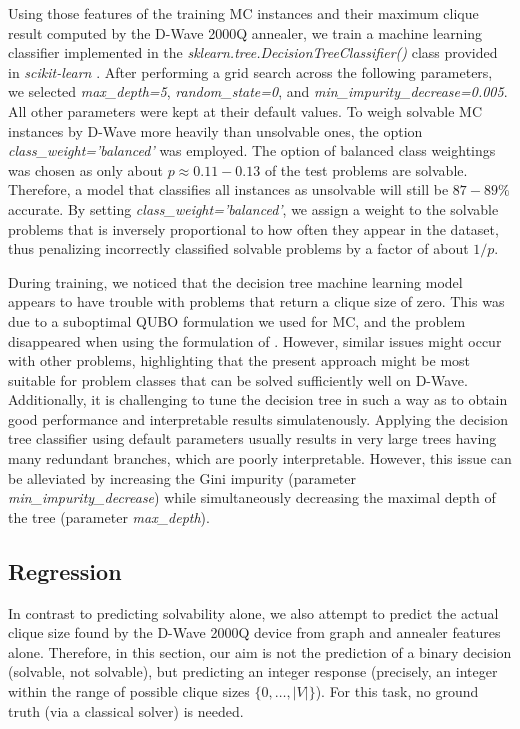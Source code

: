 \documentclass[a4paper,11pt]{article}
\begin{document}
Using those features of the training MC instances and their maximum clique result computed by the D-Wave 2000Q annealer, we train a machine learning classifier implemented in the \textit{sklearn.tree.DecisionTreeClassifier()} class provided in \textit{scikit-learn} \cite{scikit-learn}. After performing a grid search across the following parameters, we selected \textit{max\_depth=5}, \textit{random\_state=0}, and \textit{min\_impurity\_decrease=0.005}. All other parameters were kept at their default values. To weigh solvable MC instances by D-Wave more heavily than unsolvable ones, the option \textit{class\_weight='balanced'} was employed. The option of balanced class weightings was chosen as only about $p \approx 0.11-0.13$ of the test problems are solvable. Therefore, a model that classifies all instances as unsolvable will still be $87-89\%$ accurate. By setting \textit{class\_weight='balanced'}, we assign a weight to the solvable problems that is inversely proportional to how often they appear in the dataset, thus penalizing incorrectly classified solvable problems by a factor of about $1/p$.

During training, we noticed that the decision tree machine learning model appears to have trouble with problems that return a clique size of zero. This was due to a suboptimal QUBO formulation we used for MC, and the problem disappeared when using the formulation of \cite{Chapuis2019, qtop}. However, similar issues might occur with other problems, highlighting that the present approach might be most suitable for problem classes that can be solved sufficiently well on D-Wave. Additionally, it is challenging to tune the decision tree in such a way as to obtain good performance and interpretable results simulatenously. Applying the decision tree classifier using default parameters usually results in very large trees having many redundant branches, which are poorly interpretable. However, this issue can be alleviated by increasing the Gini impurity (parameter \textit{min\_impurity\_decrease}) while simultaneously decreasing the maximal depth of the tree (parameter \textit{max\_depth}).

\subsection{Regression}
In contrast to predicting solvability alone, we also attempt to predict the actual clique size found by the D-Wave 2000Q device from graph and annealer features alone. Therefore, in this section, our aim is not the prediction of a binary decision (solvable, not solvable), but predicting an integer response (precisely, an integer within the range of possible clique sizes $\{0,\ldots,|V|\}$). For this task, no ground truth (via a classical solver) is needed.
\end{document}
